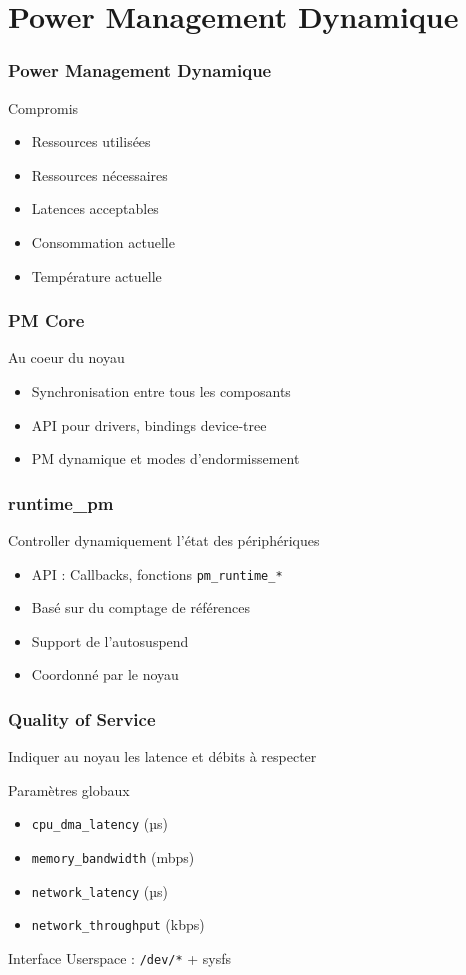 \section{Power Management Dynamique}

\begin{frame}
	\frametitle{Power Management Dynamique}
	\begin{block}{Compromis}
	\begin{itemize}
		\item Ressources utilisées
		\item Ressources nécessaires
		\item Latences acceptables
		\item Consommation actuelle
		\item Température actuelle
	\end{itemize}
	\end{block}
\end{frame}

\begin{frame}
	\frametitle{PM Core}
	\begin{block}{Au coeur du noyau}
		\begin{itemize}
			\item Synchronisation entre tous les composants
			\item API pour drivers, bindings device-tree
			\item PM dynamique et modes d'endormissement
		\end{itemize}
	\end{block}
\end{frame}
\begin{frame}
	\frametitle{runtime\_pm}
	\begin{block}{Controller dynamiquement l'état des périphériques}
		\begin{itemize}
			\item API : Callbacks, fonctions \texttt{pm\_runtime\_*}
			\item Basé sur du comptage de références
			\item Support de l'autosuspend
			\item Coordonné par le noyau
		\end{itemize}
	\end{block}
\end{frame}

\begin{frame}
	\frametitle{Quality of Service}
	Indiquer au noyau les latence et débits à respecter
	\begin{block}{Paramètres globaux}
		\begin{itemize}
			\item \texttt{cpu\_dma\_latency} (µs)
			\item \texttt{memory\_bandwidth} (mbps)
			\item \texttt{network\_latency} (µs)
			\item \texttt{network\_throughput} (kbps)
		\end{itemize}
	\end{block}
	Interface Userspace : \texttt{/dev/*} + sysfs
\end{frame}


